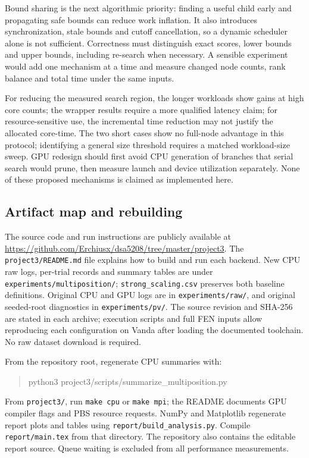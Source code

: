 \documentclass[11pt,a4paper]{article}
\newcommand{\code}[1]{\texttt{#1}}
\begin{document}
Bound sharing is the next algorithmic priority: finding a useful child early
and propagating safe bounds can reduce work inflation. It also introduces
synchronization, stale bounds and cutoff cancellation, so a dynamic scheduler
alone is not sufficient. Correctness must distinguish exact scores, lower
bounds and upper bounds, including re-search when necessary. A sensible
experiment would add one mechanism at a time and measure changed node counts,
rank balance and total time under the same inputs.

For reducing the measured search region, the longer workloads show gains at
high core counts; the wrapper results require a more qualified latency claim; for
resource-sensitive use, the incremental time reduction may not justify the
allocated core-time. The two short cases show no full-node advantage in this protocol; identifying
a general size threshold requires a matched workload-size sweep. GPU
redesign should first avoid CPU generation of branches that serial search
would prune, then measure launch and device utilization separately. None of
these proposed mechanisms is claimed as implemented here.

\subsection{Artifact map and rebuilding}
The source code and run instructions are publicly available at
\url{https://github.com/Erchiusx/dsa5208/tree/master/project3}.
The \code{project3/README.md} file explains how to build and run each backend.
New CPU raw logs,
per-trial records and summary tables are under
\code{experiments/multiposition/}; \code{strong\_scaling.csv} preserves both
baseline definitions. Original CPU and GPU logs are in \code{experiments/raw/},
and original seeded-root diagnostics in \code{experiments/pv/}.
The source revision and SHA-256 are stated in each archive; execution scripts
and full FEN inputs allow reproducing each configuration on Vanda after loading
the documented toolchain. No raw dataset download is required.

From the repository root, regenerate CPU summaries with:
\begin{quote}\small\ttfamily
python3 project3/scripts/summarize\_multiposition.py
\end{quote}
From \code{project3/}, run \code{make cpu} or \code{make mpi}; the README documents
GPU compiler flags and PBS resource requests. NumPy and Matplotlib regenerate
report plots and tables using \code{report/build\_analysis.py}. Compile
\code{report/main.tex} from that directory. The repository also contains the
editable report source. Queue waiting is excluded from all performance measurements.
\end{document}
